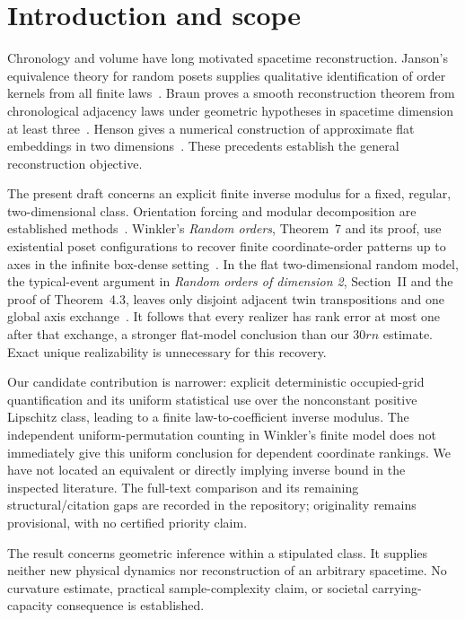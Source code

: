 \documentclass[11pt]{article}
\theoremstyle{remark}
\begin{document}
\section{Introduction and scope}
Chronology and volume have long motivated spacetime reconstruction.
Janson's equivalence theory for random posets supplies qualitative
identification of order kernels from all finite laws~\cite{Janson}.
Braun proves a smooth reconstruction theorem from chronological
adjacency laws under geometric hypotheses in spacetime dimension at
least three~\cite{Braun}. Henson gives a numerical construction of
approximate flat embeddings in two dimensions~\cite{Henson}.
These precedents establish the general reconstruction objective.

The present draft concerns an explicit finite inverse modulus for a
fixed, regular, two-dimensional class. Orientation forcing and modular
decomposition are established methods~\cite{KlavikZeman}. Winkler's
\emph{Random orders}, Theorem~7 and its proof, use existential poset
configurations to recover finite coordinate-order patterns up to axes
in the infinite box-dense setting~\cite{Winkler1985}. In the flat
two-dimensional random model, the typical-event argument in
\emph{Random orders of dimension 2}, Section~II and the proof of
Theorem~4.3, leaves only disjoint adjacent twin transpositions and one
global axis exchange~\cite{Winkler}. It follows that every realizer has
rank error at most one after that exchange, a stronger flat-model
conclusion than our $30rn$ estimate. Exact unique realizability is
unnecessary for this recovery.

Our candidate contribution is narrower: explicit deterministic
occupied-grid quantification and its uniform statistical use over the
nonconstant positive Lipschitz class, leading to a finite
law-to-coefficient inverse modulus. The independent uniform-permutation
counting in Winkler's finite model does not immediately give this
uniform conclusion for dependent coordinate rankings. We have not
located an equivalent or directly implying inverse bound in the
inspected literature. The full-text comparison and its remaining
structural/citation gaps are recorded in the repository; originality
remains provisional, with no certified priority claim.

The result concerns geometric inference within a stipulated class.
It supplies neither new physical dynamics nor reconstruction of an
arbitrary spacetime. No curvature estimate, practical sample-complexity
claim, or societal carrying-capacity consequence is established.
\end{document}

